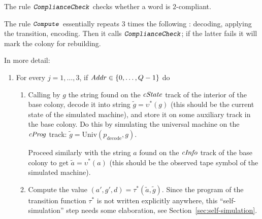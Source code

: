 \documentclass[12pt]{memoir}
\newcommand{\fld}[1]{\ensuremath{\textit{#1\/}}}
\newcommand{\rul}[1]{\ensuremath{\texttt{\slshape #1\/}}}
\newcommand{\Q}{Q}
\newcommand{\Addr}{\fld{Addr}}
\newcommand{\cAddr}{\fld{cAddr}}
\newcommand{\cInfo}{\fld{cInfo}}
\newcommand{\cKind}{\fld{cKind}}
\newcommand{\cProg}{\fld{cProg}}
\newcommand{\cState}{\fld{cState}}
\newcommand{\decode}{\mathrm{decode}}
\newcommand{\Member}{\mathrm{Member}}
\newcommand{\Un}{\mathrm{Univ}}
\newcommand{\Comp}{\rul{Compute}}
\begin{document}
The rule \( \rul{ComplianceCheck} \) checks whether a word is \( 2 \)-compliant.

The rule \( \Comp \) essentially repeats 3 times %
the following : decoding, applying the transition, encoding.
Then it calls \( \rul{ComplianceCheck} \); if the latter fails
it will mark the colony for rebuilding.

In more detail:
\begin{enumerate}

      \item For every \( j=1,\dots,3 \), if \( \Addr \in \set{0, \dots, \Q-1} \) do 

       \begin{enumerate}

          \item Calling by \( g \) the  string found on the \( \cState \) track of
            the interior of the base colony,
            decode it into string \( \tilde g=\upsilon^{*}(g) \)
            (this should be the current state of the simulated machine), and
            store it on some auxiliary track in the base colony.
            Do this by simulating the universal machine on the \( \cProg \) track:
            \( \tilde g = \Un(p_{\decode}, g) \).

            Proceed similarly with the string \( a \) found on the \( \cInfo \)
            track of the base colony to get \( \tilde a = \upsilon^{*}(a) \)
            (this should be the observed tape symbol of the simulated machine).
          

          \item \label{i:comp.trans}
           Compute the value \( (a',g',d)=\tau^{*}(\tilde a, \tilde g) \).
           Since the program of the transition function \( \tau^{*} \) is not written explicitly anywhere, 
           this ``self-simulation'' step needs some elaboration, see Section~\ref{sec:self-simulation}.


\end{enumerate}
\end{enumerate}
\end{document}
